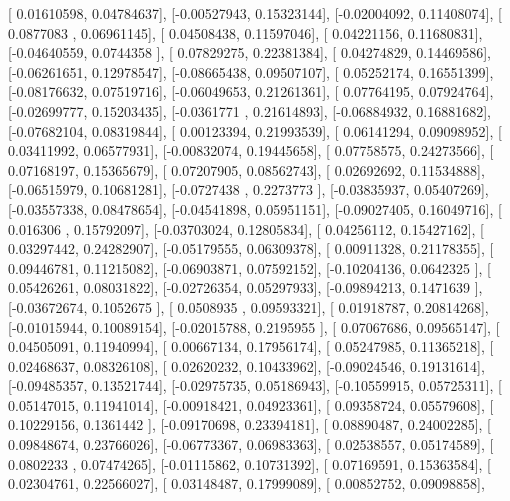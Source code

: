 \documentclass{article}
\begin{document}
       [ 0.01610598,  0.04784637],
       [-0.00527943,  0.15323144],
       [-0.02004092,  0.11408074],
       [ 0.0877083 ,  0.06961145],
       [ 0.04508438,  0.11597046],
       [ 0.04221156,  0.11680831],
       [-0.04640559,  0.0744358 ],
       [ 0.07829275,  0.22381384],
       [ 0.04274829,  0.14469586],
       [-0.06261651,  0.12978547],
       [-0.08665438,  0.09507107],
       [ 0.05252174,  0.16551399],
       [-0.08176632,  0.07519716],
       [-0.06049653,  0.21261361],
       [ 0.07764195,  0.07924764],
       [-0.02699777,  0.15203435],
       [-0.0361771 ,  0.21614893],
       [-0.06884932,  0.16881682],
       [-0.07682104,  0.08319844],
       [ 0.00123394,  0.21993539],
       [ 0.06141294,  0.09098952],
       [ 0.03411992,  0.06577931],
       [-0.00832074,  0.19445658],
       [ 0.07758575,  0.24273566],
       [ 0.07168197,  0.15365679],
       [ 0.07207905,  0.08562743],
       [ 0.02692692,  0.11534888],
       [-0.06515979,  0.10681281],
       [-0.0727438 ,  0.2273773 ],
       [-0.03835937,  0.05407269],
       [-0.03557338,  0.08478654],
       [-0.04541898,  0.05951151],
       [-0.09027405,  0.16049716],
       [ 0.016306  ,  0.15792097],
       [-0.03703024,  0.12805834],
       [ 0.04256112,  0.15427162],
       [ 0.03297442,  0.24282907],
       [-0.05179555,  0.06309378],
       [ 0.00911328,  0.21178355],
       [ 0.09446781,  0.11215082],
       [-0.06903871,  0.07592152],
       [-0.10204136,  0.0642325 ],
       [ 0.05426261,  0.08031822],
       [-0.02726354,  0.05297933],
       [-0.09894213,  0.1471639 ],
       [-0.03672674,  0.1052675 ],
       [ 0.0508935 ,  0.09593321],
       [ 0.01918787,  0.20814268],
       [-0.01015944,  0.10089154],
       [-0.02015788,  0.2195955 ],
       [ 0.07067686,  0.09565147],
       [ 0.04505091,  0.11940994],
       [ 0.00667134,  0.17956174],
       [ 0.05247985,  0.11365218],
       [ 0.02468637,  0.08326108],
       [ 0.02620232,  0.10433962],
       [-0.09024546,  0.19131614],
       [-0.09485357,  0.13521744],
       [-0.02975735,  0.05186943],
       [-0.10559915,  0.05725311],
       [ 0.05147015,  0.11941014],
       [-0.00918421,  0.04923361],
       [ 0.09358724,  0.05579608],
       [ 0.10229156,  0.1361442 ],
       [-0.09170698,  0.23394181],
       [ 0.08890487,  0.24002285],
       [ 0.09848674,  0.23766026],
       [-0.06773367,  0.06983363],
       [ 0.02538557,  0.05174589],
       [ 0.0802233 ,  0.07474265],
       [-0.01115862,  0.10731392],
       [ 0.07169591,  0.15363584],
       [ 0.02304761,  0.22566027],
       [ 0.03148487,  0.17999089],
       [ 0.00852752,  0.09098858],
\end{document}
